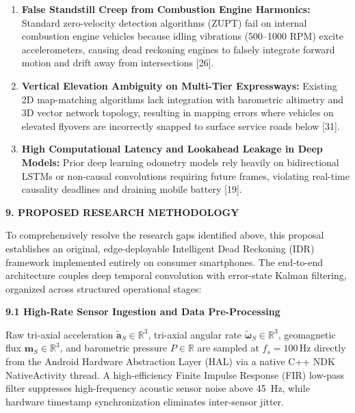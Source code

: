 \documentclass[11pt,a4paper]{article}
\begin{document}
\begin{enumerate}[label=\textbf{Gap \arabic*:},leftmargin=1.5cm,itemsep=1.5pt,resume]
\item \textbf{False Standstill Creep from Combustion Engine Harmonics:}
Standard zero-velocity detection algorithms (ZUPT) fail on internal combustion engine vehicles because idling vibrations (500–1000 RPM) excite accelerometers, causing dead reckoning engines to falsely integrate forward motion and drift away from intersections [26].

\item \textbf{Vertical Elevation Ambiguity on Multi-Tier Expressways:}
Existing 2D map-matching algorithms lack integration with barometric altimetry and 3D vector network topology, resulting in mapping errors where vehicles on elevated flyovers are incorrectly snapped to surface service roads below [31].

\item \textbf{High Computational Latency and Lookahead Leakage in Deep Models:}
Prior deep learning odometry models rely heavily on bidirectional LSTMs or non-causal convolutions requiring future frames, violating real-time causality deadlines and draining mobile battery [19].
\end{enumerate}

\vspace{0.15cm}
\begin{center}
{\large \textbf{9. PROPOSED RESEARCH METHODOLOGY}}
\end{center}

To comprehensively resolve the research gaps identified above, this proposal establishes an original, edge-deployable Intelligent Dead Reckoning (IDR) framework implemented entirely on consumer smartphones. The end-to-end architecture couples deep temporal convolution with error-state Kalman filtering, organized across structured operational stages:

\textbf{9.1 High-Rate Sensor Ingestion and Data Pre-Processing}

Raw tri-axial acceleration $\tilde{\mathbf{a}}_S \in \mathbb{R}^3$, tri-axial angular rate $\tilde{\boldsymbol{\omega}}_S \in \mathbb{R}^3$, geomagnetic flux $\mathbf{m}_S \in \mathbb{R}^3$, and barometric pressure $P \in \mathbb{R}$ are sampled at $f_s = 100\,\text{Hz}$ directly from the Android Hardware Abstraction Layer (HAL) via a native C++ NDK NativeActivity thread. A high-efficiency Finite Impulse Response (FIR) low-pass filter suppresses high-frequency acoustic sensor noise above 45~Hz, while hardware timestamp synchronization eliminates inter-sensor jitter.
\end{document}
